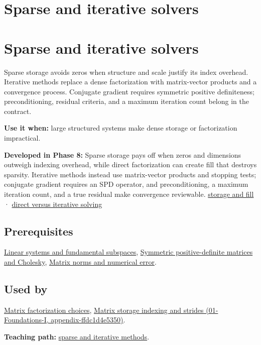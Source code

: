 \hypertarget{appendix-67c87a3d9e94}{}
\section*{Sparse and iterative solvers}
\section{Sparse and iterative solvers}\label{appendix-67c87a3d9e94-sparse-and-iterative-solvers}

Sparse storage avoids zeros when structure and scale justify its index overhead. Iterative methods replace a dense factorization with matrix-vector products and a convergence process. Conjugate gradient requires symmetric positive definiteness; preconditioning, residual criteria, and a maximum iteration count belong in the contract.

\textbf{Use it when:} large structured systems make dense storage or factorization impractical.

\textbf{Developed in Phase 8:} Sparse storage pays off when zeros and dimensions outweigh indexing overhead, while direct factorization can create fill that destroys sparsity. Iterative methods instead use matrix-vector products and stopping tests; conjugate gradient requires an SPD operator, and preconditioning, a maximum iteration count, and a true residual make convergence reviewable. \hyperref[02-foundations-ii-ch038-sparse-storage-changes-the-cost-model]{storage and fill} · \hyperref[02-foundations-ii-ch038-direct-and-iterative-solvers-suit-different-workloads]{direct versus iterative solving}

\subsection{Prerequisites}\label{appendix-67c87a3d9e94-prerequisites}

\hyperref[appendix-8572a4a060c1]{Linear systems and fundamental subspaces}, \hyperref[appendix-50d2ea3c9b26]{Symmetric positive-definite matrices and Cholesky}, \hyperref[appendix-f8657bac66e5]{Matrix norms and numerical error}.

\subsection{Used by}\label{appendix-67c87a3d9e94-used-by}

\hyperref[appendix-221a483bec2d]{Matrix factorization choices}, \href{../01-Foundations-I/main.pdf\#nameddest=appendix-ffdc1d4e5350}{Matrix storage indexing and strides (01-Foundations-I, appendix-ffdc1d4e5350)}.

\textbf{Teaching path:} \hyperref[02-foundations-ii-ch038-sparse-problems-change-the-economics-of-solving]{sparse and iterative methods}.
